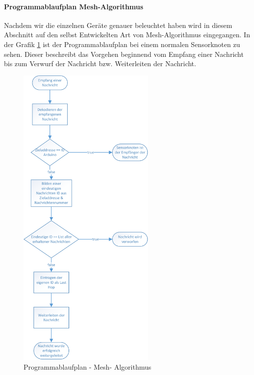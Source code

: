 \paragraph{Programmablaufplan Mesh-Algorithmus} Nachdem wir die einzelnen Geräte genauer beleuchtet haben wird in diesem Abschnitt auf den selbst Entwickelten Art von Mesh-Algorithmus eingegangen. In der Grafik \ref{img:PAPMeshAlgo} ist der Programmablaufplan bei einem normalen Sensorknoten zu sehen. Dieser beschreibt das Vorgehen beginnend vom Empfang einer Nachricht bis zum Verwurf der Nachricht bzw. Weiterleiten der Nachricht. 

\begin{figure}
	\centering
	\includegraphics[width=0.6\textwidth]{bilder/PAPMesh.png}
	\caption{Programmablaufplan - Mesh- Algorithmus}
	\label{img:PAPMeshAlgo}
\end{figure}
